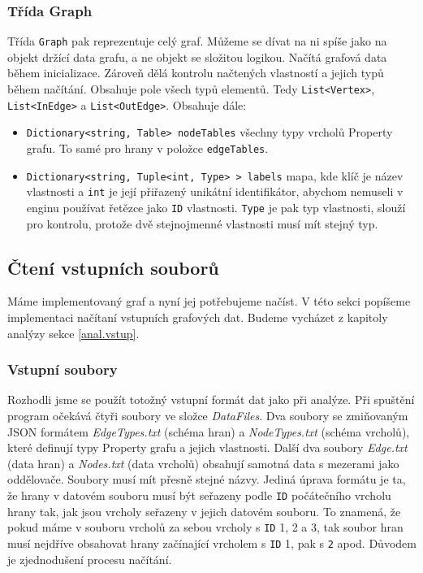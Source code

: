 \subsubsection{Třída Graph}

Třída \texttt{Graph} pak reprezentuje celý graf.
Můžeme se dívat na ni spíše jako na objekt držící data grafu, a ne objekt se složitou logikou.
Načítá grafová data během inicializace.
Zároveň dělá kontrolu načtených vlastností a jejich typů během načítání.
Obsahuje pole všech typů elementů. Tedy \texttt{List<Vertex>}, \texttt{List<InEdge>} a \texttt{List<OutEdge>}.
Obsahuje dále:
\begin{itemize}
\item \texttt{Dictionary<string, Table> nodeTables} všechny typy vrcholů Property grafu. To samé pro hrany v položce \texttt{edgeTables}.
\item \texttt{Dictionary<string, Tuple<int, Type> > labels} mapa, kde klíč je název vlastnosti a \texttt{int} je její přiřazený unikátní identifikátor, abychom nemuseli v enginu používat řetězce jako \texttt{ID} vlastnosti.
\texttt{Type} je pak typ vlastnosti, slouží pro kontrolu, protože dvě stejnojmenné vlastnosti musí mít stejný typ. 
\end{itemize}


\subsection{Čtení vstupních souborů} \label{impl.vstup}

Máme implementovaný graf a nyní jej potřebujeme načíst.
V této sekci popíšeme implementaci načítaní vstupních grafových dat.
Budeme vycházet z kapitoly analýzy sekce \ref{anal.vstup}.

\subsubsection{Vstupní soubory}

Rozhodli jsme se použít totožný vstupní formát dat jako při analýze.
Při spuštění program očekává čtyři soubory ve složce \textit{DataFiles}.
Dva soubory se zmiňovaným JSON formátem \textit{EdgeTypes.txt} (schéma hran) a \textit{NodeTypes.txt} (schéma vrcholů), které definují typy Property grafu a jejich vlastnosti.
Další dva soubory \textit{Edge.txt} (data hran) a \textit{Nodes.txt} (data vrcholů) obsahují samotná data s mezerami jako oddělovače.
Soubory musí mít přesně stejné názvy.
Jediná úprava formátu je ta, že hrany v datovém souboru musí být seřazeny podle \texttt{ID} počátečního vrcholu hrany tak, jak jsou vrcholy seřazeny v jejich datovém souboru.
To znamená, že pokud máme v souboru vrcholů za sebou vrcholy s \texttt{ID} 1, 2 a 3, tak soubor hran musí nejdříve obsahovat hrany začínající vrcholem s \texttt{ID} 1, pak s \texttt{2} apod.
Důvodem je zjednodušení procesu načítání.

